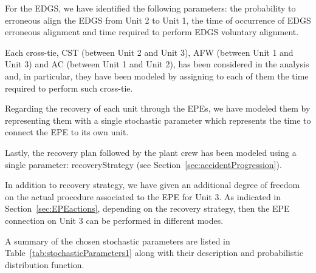 For the EDGS, we have identified the following parameters: the probability to 
erroneous align the EDGS from Unit 2 to Unit 1, the time of occurrence of EDGS
erroneous alignment and time required to perform EDGS voluntary alignment.  

Each cross-tie, CST (between Unit 2 and Unit 3), AFW (between Unit 1 and Unit 3) 
and AC (between Unit 1 and Unit 2), has been considered in the analysis and, in 
particular, they have been modeled by assigning to each of them the time required 
to perform such cross-tie.

Regarding the recovery of each unit through the EPEs, we have modeled them by 
representing them with a single stochastic parameter which represents the
time to connect the EPE to its own unit.

Lastly, the recovery plan followed by the plant crew has been modeled using a single
parameter: recoveryStrategy (see Section~\ref{sec:accidentProgression}).

In addition to recovery strategy, we have given an additional degree of freedom on 
the actual procedure associated to the EPE for Unit 3. 
As indicated in Section~\ref{sec:EPEactions}, depending on the  recovery strategy, 
then the EPE connection on Unit 3 can be performed in different modes. 

A summary of the chosen stochastic parameters are listed in Table~\ref{tab:stochasticParameters1} 
along with their description and probabilistic distribution function.


